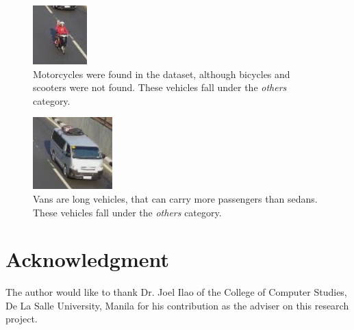 \documentclass[conference]{IEEEtran}
\begin{document}
\begin{figure}[!h]
\centering
\includegraphics{vehicle_motorcycle.png}
\caption{Motorcycles were found in the dataset, although bicycles and scooters were not found. These vehicles fall under the \textit{others} category.}
\label{fig_motorcycle}
\end{figure}


\begin{figure}[!h]
\centering
\includegraphics{vehicle_van.png}
\caption{Vans are long vehicles, that can carry more passengers than sedans. These vehicles fall under the \textit{others} category.}
\label{fig_van}
\end{figure}

\section*{Acknowledgment}

The author would like to thank Dr. Joel Ilao of the College of Computer Studies, De La Salle University, Manila for his contribution as the adviser on this research project.


\ifCLASSOPTIONcaptionsoff
  \newpage
\fi



\end{document}
